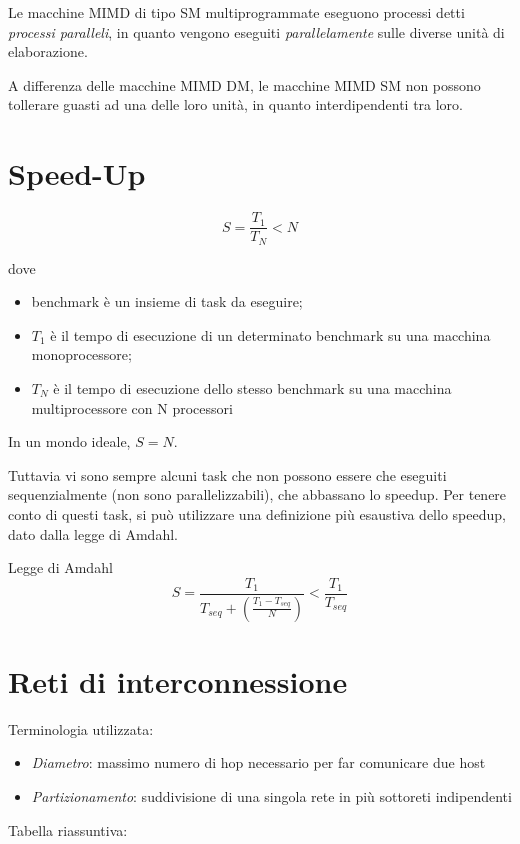 \documentclass[12pt,a4paper]{article}
\begin{document}
Le macchine MIMD di tipo SM multiprogrammate eseguono processi detti
\emph{processi paralleli}, in quanto vengono eseguiti \emph{parallelamente}
sulle diverse unità di elaborazione.

A differenza delle macchine MIMD DM, le macchine MIMD SM non possono
tollerare guasti ad una delle loro unità, in quanto interdipendenti tra loro.

\section{Speed-Up}
  $$ S = \frac{T_1}{T_N} < N $$

  dove

  \begin{itemize}
    \item benchmark è un insieme di task da eseguire;
    \item $ T_1 $ è il tempo di esecuzione di un determinato benchmark su
      una macchina monoprocessore;
    \item $ T_N $ è il tempo di esecuzione dello stesso benchmark su
      una macchina multiprocessore con N processori
  \end{itemize}

  In un mondo ideale, $ S = N $.

  Tuttavia vi sono sempre alcuni task che non possono essere che eseguiti
  sequenzialmente (non sono parallelizzabili), che abbassano lo speedup.
  Per tenere conto di questi task, si può utilizzare una definizione più
  esaustiva dello speedup, dato dalla legge di Amdahl.

  Legge di Amdahl
  $$ S = \frac{T_1}{T_{seq} + (\frac{T_1 - T_{seq}}{N})} < \frac{T_1}{T_{seq}} $$

\section{Reti di interconnessione}
Terminologia utilizzata:

\begin{itemize}
  \item \emph{Diametro}: massimo numero di hop necessario per far comunicare due host
  \item \emph{Partizionamento}: suddivisione di una singola rete in più sottoreti indipendenti
\end{itemize}

Tabella riassuntiva:
\end{document}
